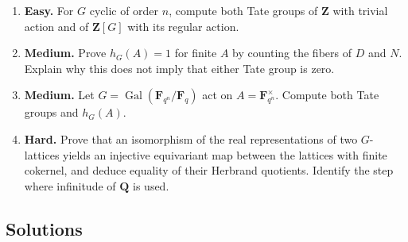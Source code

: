 \documentclass[11pt,a4paper]{article}
\newcommand{\tightlist}{\setlength{\itemsep}{0pt}\setlength{\parskip}{0pt}}
\begin{document}
\begin{enumerate}
\def\labelenumi{\arabic{enumi}.}
\tightlist
\item
  \textbf{Easy.} For \(G\) cyclic of order \(n\), compute both Tate
  groups of \(\mathbf Z\) with trivial action and of \(\mathbf Z[G]\)
  with its regular action.
\item
  \textbf{Medium.} Prove \(h_G(A)=1\) for finite \(A\) by counting the
  fibers of \(D\) and \(N\). Explain why this does not imply that either
  Tate group is zero.
\item
  \textbf{Medium.} Let
  \(G=\operatorname{Gal}(\mathbf F_{q^n}/\mathbf F_q)\) act on
  \(A=\mathbf F_{q^n}^{\times}\). Compute both Tate groups and
  \(h_G(A)\).
\item
  \textbf{Hard.} Prove that an isomorphism of the real representations
  of two \(G\)-lattices yields an injective equivariant map between the
  lattices with finite cokernel, and deduce equality of their Herbrand
  quotients. Identify the step where infinitude of \(\mathbf Q\) is
  used.
\end{enumerate}

\subsection{Solutions}\label{solutions}
\end{document}
